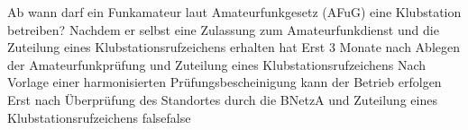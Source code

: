     {Ab wann darf ein Funkamateur laut Amateurfunkgesetz (AFuG) eine Klubstation betreiben?}
    {Nachdem er selbst eine Zulassung zum Amateurfunkdienst und die Zuteilung eines Klubstationsrufzeichens erhalten hat}
    {Erst 3 Monate nach Ablegen der Amateurfunkprüfung und Zuteilung eines Klubstationsrufzeichens}
    {Nach Vorlage einer harmonisierten Prüfungsbescheinigung kann der Betrieb erfolgen}
    {Erst nach Überprüfung des Standortes durch die BNetzA und Zuteilung eines Klubstationsrufzeichens}
    {false}{false}